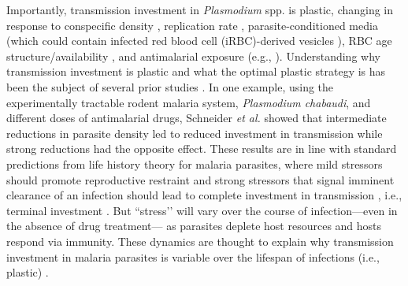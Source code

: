 \documentclass[10pt,letterpaper]{article}
\begin{document}
Importantly, transmission investment in \emph{Plasmodium} spp. is plastic, changing in response to conspecific density \cite{pollitt_competition_2011,cameron_plasticity_2013}, replication rate \cite{schneider_adaptive_2018}, parasite-conditioned media \cite{williams_stimulation_1999, dyer_regulation_2003} (which could contain infected red blood cell (iRBC)-derived vesicles \cite{mantel_malaria-infected_2013}), RBC age structure/availability \cite{trager_enhanced_1992, trager_plasmodium_1999, reece_host_2005, schneider_adaptive_2018}, and antimalarial exposure (e.g., \cite{buckling_plasmodium_1999, schneider_adaptive_2018}). Understanding why transmission investment is plastic and what the optimal plastic strategy is has been the subject of several prior studies \cite{koella_optimal_1995,reece_synthesis_2009, carter_stress_2013, greischar_predicting_2016, birget_phenotypic_2017,schneider_adaptive_2018}. In one example, using the experimentally tractable rodent malaria system, \emph{Plasmodium chabaudi}, and different doses of antimalarial drugs, Schneider \emph{et al.} \cite{schneider_adaptive_2018} showed that intermediate reductions in parasite density led to reduced investment in transmission while strong reductions had the opposite effect. These results are in line with standard predictions from life history theory for malaria parasites, where mild stressors should promote reproductive restraint and strong stressors that signal imminent clearance of an infection should lead to complete investment in transmission \cite{carter_stress_2013}, i.e., terminal investment \cite{clutton-brock_reproductive_2015}. But ``stress’’ will vary over the course of infection---even in the absence of drug treatment--- as parasites deplete host resources and hosts respond via immunity. These dynamics are thought to explain why transmission investment in malaria parasites is variable over the lifespan of infections (i.e., plastic) \cite{eichner_genesis_2001,reece_synthesis_2009, pollitt_competition_2011,cameron_plasticity_2013,greischar_quantifying_2016, schneider_adaptive_2018}. \newline
\end{document}
